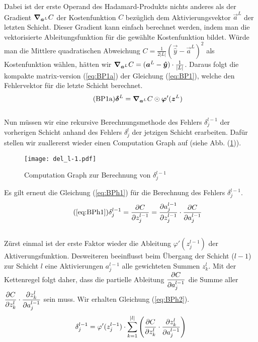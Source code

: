 \begin{appendices}
Dabei ist der erste Operand des Hadamard-Produkts nichts anderes als
der Gradient $\bm{\nabla}_{\bm{a}^L} C$ der Kostenfunktion $C$ bezüglich dem Aktivierungsvektor
$\vec{a}^L$ der letzten Schicht. Dieser Gradient kann einfach berechnet werden, indem man die
vektorisierte Ableitungsfunktion für die gewählte Kostenfunktion bildet. Würde man die
Mittlere quadratischen Abweichung $C = \frac{1}{2|L|}(\vec{\hat{y}} - \vec{a}^L)^2$ als Kostenfunktion wählen, hätten wir
$\bm{\nabla}_{\bm{a}^L} C = (\bm{a}^L - \bm{\hat{y}}) \cdot \frac{1}{|L|}$.
\para{}
Daraus folgt die kompakte matrix-version (\ref{eq:BP1a}) der Gleichung
(\ref{eq:BP1}), welche den Fehlervektor für die letzte Schicht berechnet.
\\
\begin{equation}\tag{BP1a}\label{eq:BP1a}
  \bm{\delta}^L = \bm{\nabla}_{\bm{a}^L}C \odot \bm{\varphi}'(\bm{z}^L)
\end{equation}
\\
Nun müssen wir eine rekursive Berechnungsmethode des Fehlers $\delta_j^{l-1}$
der vorherigen Schicht anhand des Fehlers $\delta_j^l$ der jetzigen Schicht
erarbeiten. Dafür stellen wir zuallererst wieder einen Computation Graph auf
(siehe Abb. (\ref{fig:cg_L-1})).
\para{}
\begin{figure}[h!]
  \centering
  \texttt{[image: del\_l-1.pdf]}
  \caption{Computation Graph zur Berechnung von $\delta_j^{l-1}$}
  \label{fig:cg_L-1}
\end{figure}
\para{}
Es gilt erneut die Gleichung (\ref{eq:BPh1}) für die Berechnung des Fehlers $\delta_j^{l-1}$.
\\
\begin{equation}\tag{\ref{eq:BPh1}}
  \delta_j^{l-1} = \partderiv{C}{z_j^{l-1}} = \partderiv{a_j^{l-1}}{z_j^{l-1}} \cdot \partderiv{C}{a_j^{l-1}}
\end{equation}
\\
Zürst einmal ist der erste Faktor wieder die Ableitung $\varphi'(z_j^{l-1})$ der Aktiverungsfunktion.
Desweiteren beeinflusst beim Übergang der Schicht ($l-1$) zur Schicht $l$ eine Aktivierungen
$a_j^{l-1}$ alle gewichteten Summen $z_k^l$. Mit der Kettenregel folgt daher,
dass die partielle Ableitung $\displaystyle\frac{\partial C}{\partial a_j^{l-1}}$ die Summe aller
$\displaystyle\frac{\partial C}{\partial z_k^l} \cdot \displaystyle\frac{\partial z_k^l}{\partial a_j^{l-1}}$ sein muss. Wir
erhalten Gleichung (\ref{eq:BPh2}).
\\
\begin{equation}\label{eq:BPh2}
  \delta_j^{l-1} = \varphi'(z_j^{l-1}) \cdot \sum_{k=1}^{|l|} \left( \partderiv{C}{z_k^l} \cdot \partderiv{z_k^l}{a_j^{l-1}} \right)

\end{equation}
\end{appendices}
